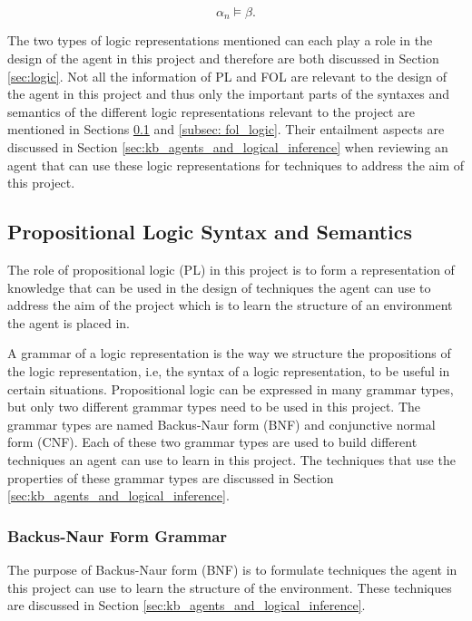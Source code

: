 \begin{equation}
	\alpha_n \models \beta.
	\label{eq:entailment}
\end{equation}


The two types of logic representations mentioned can each play a role in the design of the  agent in this project and therefore are both discussed in Section \ref{sec:logic}. Not all the information of PL and FOL are relevant to the design of the agent in this project and thus only the important parts of the syntaxes and semantics of the different logic representations relevant to the project are mentioned in Sections \ref{subsec: prop_logic} and \ref{subsec: fol_logic}.
Their entailment aspects are discussed in Section \ref{sec:kb_agents_and_logical_inference} when reviewing an agent that can use these logic representations for techniques to address the aim of this project.


\subsection{Propositional Logic Syntax and Semantics}
\label{subsec: prop_logic}

The role of propositional logic (PL) in this project is to form a representation of knowledge that can be used in the design of techniques the agent can use to address the aim of the project  which is to learn the structure of an environment the agent is placed in.

A grammar of a logic representation is the way we structure the propositions of the logic representation, i.e, the syntax of a logic representation, to be useful in certain situations.
Propositional logic can be expressed in many grammar types, but only two different grammar types need to be used in this project.  The grammar types are named Backus-Naur form (BNF) and conjunctive normal form (CNF). Each of these two grammar types are used to build different techniques an agent can use to learn in this project. The techniques that use the properties of these grammar types are discussed in Section \ref{sec:kb_agents_and_logical_inference}.

\subsubsection{Backus-Naur Form Grammar}
\label{subsubsec:BNF}

The purpose of Backus-Naur form (BNF) is to formulate techniques the agent in this project can use to learn the structure of the environment. These techniques are  discussed in Section \ref{sec:kb_agents_and_logical_inference}.

